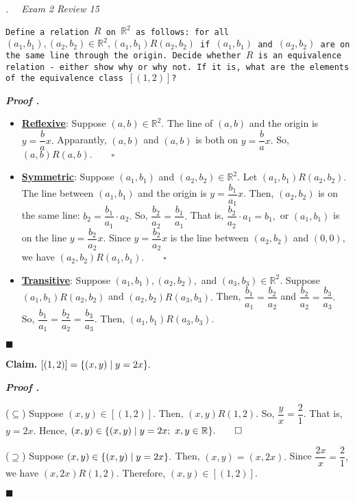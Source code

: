 \documentclass[11pt,letter]{article}
\newcounter{nq}[section]
\newcounter{np}[section]
\newenvironment*{p}{\par\noindent\textbf{\textit{Proof \stepcounter{np}\thenp. }}\par}{\par\hfill $\blacksquare$\par}
\newenvironment*{q}[1]{\noindent\emph{\thesection.\stepcounter{nq}\thenq$\quad $ #1}\par\noindent\texttt}{}
\newenvironment*{clm}{\par\noindent\textbf{Claim. }}{\par}
\def\R{{\mathbb{R}}}
\begin{document}
\begin{framed}\begin{q}
	{Exam 2 Review 15}
	{Define a relation $R$ on $\R^2$ as follows: for all $(a_1,b_1),(a_2,b_2)\in\R^2,(a_1,b_1)R(a_2,b_2)$ if $(a_1,b_1)$ and $(a_2,b_2)$ are on the same line through the origin. Decide whether $R$ is an equivalence relation - either show why or why not. If it is, what are the elements of the equivalence class $[(1,2)]$?}
\end{q}\end{framed}
\begin{p}
	\begin{itemize}
		\item \underline{\textbf{Reflexive}}: Suppose $(a,b)\in\R^2.$ The line of $(a,b)$ and the origin is $y=\dfrac{b}{a}x.$ Apparantly, $(a,b)$ and $(a,b)$ is both on $y=\dfrac{b}{a}x.$ So, $(a,b)R(a,b).\qquad\square$
		\item \underline{\textbf{Symmetric}}: Suppose $(a_1,b_1)$ and $(a_2,b_2)\in\R^2.$ Let $(a_1,b_1)R(a_2,b_2).$ The line between $(a_1,b_1)$ and the origin is $y=\dfrac{b_1}{a_1}x.$ Then, $(a_2,b_2)$ is on the same line: $b_2=\dfrac{b_1}{a_1}\cdot a_2.$ So, $\dfrac{b_2}{a_2}=\dfrac{b_1}{a_1}.$ That is, $\dfrac{b_2}{a_2}\cdot a_1=b_1,$ or $(a_1,b_1)$ is on the line $y=\dfrac{b_2}{a_2}x.$ Since $y=\dfrac{b_2}{a_2}x$ is the line between $(a_2,b_2)$ and $(0,0),$ we have $(a_2,b_2)R(a_1,b_1).\qquad\square$
		\item \underline{\textbf{Transitive}}: Suppose $(a_1,b_1), (a_2,b_2),$ and $(a_3,b_3)\in\R^2.$ Suppose $(a_1,b_1)R(a_2,b_2)$ and $(a_2,b_2)R(a_3,b_3).$ Then, $\dfrac{b_1}{a_1}=\dfrac{b_2}{a_2}$ and $\dfrac{b_2}{a_2}=\dfrac{b_3}{a_3}.$ So, $\dfrac{b_1}{a_1}=\dfrac{b_2}{a_2}=\dfrac{b_3}{a_3}.$ Then, $(a_1,b_1)R(a_3,b_3).$
	\end{itemize}	
\end{p}
\begin{clm}
	$[(1,2)]=\qty{(x,y)\mid y=2x}.$
\end{clm}
\begin{p}
	($\subseteq$) Suppose $(x,y)\in[(1,2)].$ Then, $(x,y)R(1,2).$ So, $\dfrac{y}{x}=\dfrac{2}{1}.$ That is, $y=2x.$ Hence, $(x,y)\in\qty{(x,y)\mid y=2x;\ x,y\in\R}.\qquad\square$\par 
	($\supseteq$) Suppose $(x,y)\in\qty{(x,y)\mid y=2x}.$ Then, $(x,y)=(x,2x).$ Since $\dfrac{2x}{x}=\dfrac{2}{1},$ we have $(x,2x)R(1,2).$ Therefore, $(x,y)\in[(1,2)].$
\end{p}

\newpage
\end{document}
